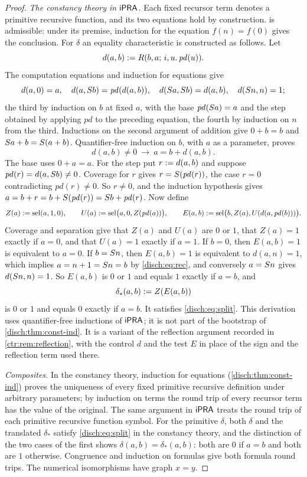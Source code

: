 \begin{proof}
\emph{The constancy theory in $\mathsf{iPRA}$.} Each fixed recursor term denotes a
primitive recursive function, and its two equations hold by construction.
 is admissible: under its premise, induction for the
equation $f(n)=f(0)$ gives the conclusion. For $\delta$ an equality
characteristic is constructed as follows. Let
\[
 d(a,b)\mathrel{:=} R(b,a;\,i,u.\,\mathit{pd}(u)).
\]
The computation equations and induction for equations give
\[
 d(a,0)=a,\quad d(a,S b)=\mathit{pd}(d(a,b)),\quad
 d(S a,S b)=d(a,b),\quad d(S n,n)=1 ;
\]
the third by induction on $b$ at fixed $a$, with the base
$\mathit{pd}(S a)=a$ and the step obtained by applying $\mathit{pd}$ to
the preceding equation, the fourth by induction on $n$ from the third.
Inductions on the second argument of addition give $0+b=b$ and
$S a+b=S(a+b)$. Quantifier-free induction on $b$, with $a$ as a
parameter, proves
\begin{equation}
 d(a,b)\neq 0\ \to\ a=b+d(a,b).
 \label{disch:eq:rec}
\end{equation}
The base uses $0+a=a$. For the step put $r\mathrel{:=} d(a,b)$ and suppose
$\mathit{pd}(r)=d(a,S b)\neq 0$. Coverage for $r$ gives
$r=S(\mathit{pd}(r))$, the case $r=0$ contradicting
$\mathit{pd}(r)\neq 0$. So $r\neq 0$, and the induction hypothesis gives
$a=b+r=b+S(\mathit{pd}(r))=S b+\mathit{pd}(r)$. Now define
\[
 Z(a)\mathrel{:=}\operatorname{sel}(a,1,0),\qquad
 U(a)\mathrel{:=}\operatorname{sel}\bigl(a,0,Z(\mathit{pd}(a))\bigr),\qquad
 E(a,b)\mathrel{:=}\operatorname{sel}\bigl(b,Z(a),U(d(a,\mathit{pd}(b)))\bigr).
\]
Coverage and separation give that $Z(a)$ and $U(a)$ are $0$ or $1$, that
$Z(a)=1$ exactly if $a=0$, and that $U(a)=1$ exactly if $a=1$. If $b=0$,
then $E(a,b)=1$ is equivalent to $a=0$. If $b=S n$, then $E(a,b)=1$ is
equivalent to $d(a,n)=1$, which implies $a=n+1=S n=b$ by
\eqref{disch:eq:rec}, and conversely $a=S n$ gives $d(S n,n)=1$. So
$E(a,b)$ is $0$ or $1$ and equals $1$ exactly if $a=b$, and
\[
 \delta_*(a,b)\mathrel{:=} Z(E(a,b))
\]
is $0$ or $1$ and equals $0$ exactly if $a=b$. It satisfies
\eqref{disch:eq:split}. This derivation uses quantifier-free inductions of
$\mathsf{iPRA}$; it is not part of the bootstrap of
\cref{disch:thm:const-ind}. It is a variant of the reflection argument
recorded in \cref{ctr:rem:reflection}, with the control $d$ and the test
$E$ in place of the sign and the reflection term used there.

\emph{Composites.} In the constancy theory, induction for equations
(\cref{disch:thm:const-ind}) proves the uniqueness of every fixed
primitive recursive definition under arbitrary parameters; by induction on
terms the round trip of every recursor term has the value of the original.
The same argument in $\mathsf{iPRA}$ treats the round trip of each primitive
recursive function symbol. For the primitive $\delta$, both $\delta$ and
the translated $\delta_*$ satisfy \eqref{disch:eq:split} in the constancy
theory, and the distinction of the two cases of the first shows
$\delta(a,b)=\delta_*(a,b)$: both are $0$ if $a=b$ and both are $1$
otherwise. Congruence and induction on formulas give both formula round
trips. The numerical isomorphisms have graph $x=y$.
\end{proof}

